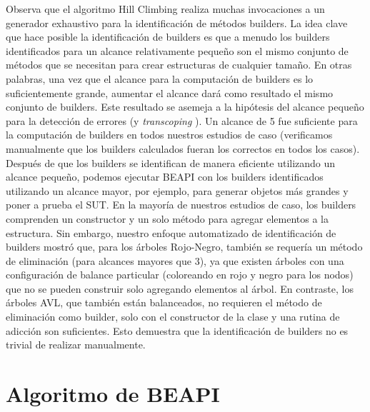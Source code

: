 Observa que el algoritmo Hill Climbing realiza muchas invocaciones a un generador exhaustivo para la identificación de métodos builders. La idea clave que hace posible la identificación de builders es que a menudo los builders identificados para un alcance relativamente pequeño son el mismo conjunto de métodos que se necesitan para crear estructuras de cualquier tamaño. En otras palabras, una vez que el alcance para la computación de builders es lo suficientemente grande, aumentar el alcance dará como resultado el mismo conjunto de builders. Este resultado se asemeja a la hipótesis del alcance pequeño para la detección de errores \cite{Andoni02} (y \emph{transcoping} \cite{Rosner13}). Un alcance de 5 fue suficiente para la computación de builders en todos nuestros estudios de caso (verificamos manualmente que los builders calculados fueran los correctos en todos los casos). Después de que los builders se identifican de manera eficiente utilizando un alcance pequeño, podemos ejecutar \textsf{BEAPI} con los builders identificados utilizando un alcance mayor, por ejemplo, para generar objetos más grandes y poner a prueba el SUT. En la mayoría de nuestros estudios de caso, los builders comprenden un constructor y un solo método para agregar elementos a la estructura. Sin embargo, nuestro enfoque automatizado de identificación de builders mostró que, para los árboles Rojo-Negro, también se requería un método de eliminación (para alcances mayores que 3), ya que existen árboles con una configuración de balance particular (coloreando en rojo y negro para los nodos) que no se pueden construir solo agregando elementos al árbol. En contraste, los árboles AVL, que también están balanceados, no requieren el método de eliminación como builder, solo con el constructor de la clase y una rutina de adicción son suficientes. Esto demuestra que la identificación de builders no es trivial de realizar manualmente.

\section{Algoritmo de BEAPI}
\label{sec:beapiTechnique}

